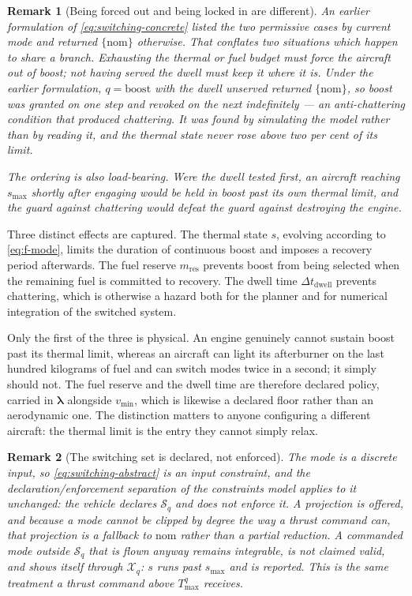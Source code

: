 \documentclass[11pt,a4paper]{article}
\newtheorem{remark}{Remark}
\newcommand{\Xset}{\mathcal{X}}
\newcommand{\Sset}{\mathcal{S}}
\newcommand{\veclambda}{\bm{\lambda}}
\begin{document}
\begin{remark}[Being forced out and being locked in are different]
An earlier formulation of \cref{eq:switching-concrete} listed the two
permissive cases by current mode and returned $\{\mathrm{nom}\}$ otherwise.
That conflates two situations which happen to share a branch. Exhausting the
thermal or fuel budget must force the aircraft \emph{out} of boost; not having
served the dwell must \emph{keep} it where it is. Under the earlier
formulation, $q = \mathrm{boost}$ with the dwell unserved returned
$\{\mathrm{nom}\}$, so boost was granted on one step and revoked on the next
indefinitely --- an anti-chattering condition that produced chattering. It was
found by simulating the model rather than by reading it, and the thermal state
never rose above two per cent of its limit.

The ordering is also load-bearing. Were the dwell tested first, an aircraft
reaching $s_{\max}$ shortly after engaging would be held in boost past its own
thermal limit, and the guard against chattering would defeat the guard against
destroying the engine.
\end{remark}

Three distinct effects are captured. The thermal state $s$, evolving according to
\cref{eq:f-mode}, limits the duration of continuous boost and imposes a recovery
period afterwards. The fuel reserve $m_{\mathrm{res}}$ prevents boost from being
selected when the remaining fuel is committed to recovery. The dwell time
$\Delta t_{\mathrm{dwell}}$ prevents chattering, which is otherwise a hazard both
for the planner and for numerical integration of the switched system.

Only the first of the three is physical. An engine genuinely cannot sustain
boost past its thermal limit, whereas an aircraft can light its afterburner on
the last hundred kilograms of fuel and can switch modes twice in a second; it
simply should not. The fuel reserve and the dwell time are therefore declared
policy, carried in $\veclambda$ alongside $v_{\min}$, which is likewise a
declared floor rather than an aerodynamic one. The distinction matters to
anyone configuring a different aircraft: the thermal limit is the entry they
cannot simply relax.

\begin{remark}[The switching set is declared, not enforced]
The mode is a discrete input, so \cref{eq:switching-abstract} is an input
constraint, and the declaration/enforcement separation of the constraints model
applies to it unchanged: the vehicle \emph{declares} $\Sset_q$ and does not
enforce it. A
projection is offered, and because a mode cannot be clipped by degree the way a
thrust command can, that projection is a fallback to $\mathrm{nom}$ rather than
a partial reduction. A commanded mode outside $\Sset_q$ that is flown anyway
remains integrable, is not claimed valid, and shows itself through
$\Xset_q$: $s$ runs past $s_{\max}$ and is reported. This is the same treatment
a thrust command above $T^{q}_{\max}$ receives.
\end{remark}
\end{document}
